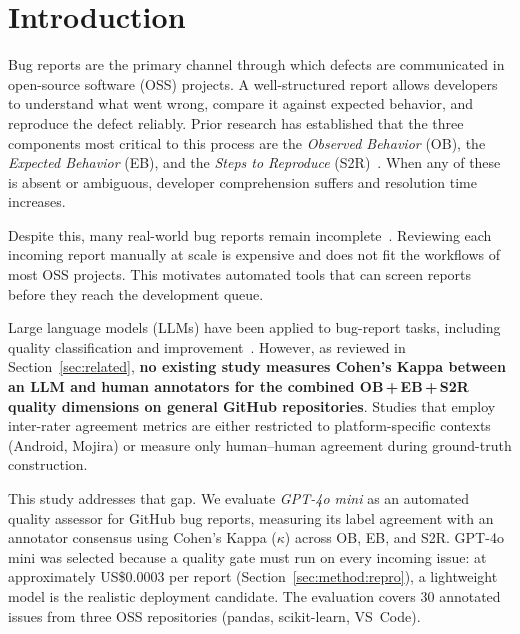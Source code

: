 
\section{Introduction}\label{sec:intro}

Bug reports are the primary channel through which defects are
communicated in open-source software (OSS) projects.  A well-structured
report allows developers to understand what went wrong, compare it
against expected behavior, and reproduce the defect reliably.  Prior
research has established that the three components most critical to
this process are the \emph{Observed Behavior} (OB), the \emph{Expected
Behavior} (EB), and the \emph{Steps to Reproduce}
(S2R)~\cite{song2020bee, mahmud2025astrobr, akyol2026improbr}.  When
any of these is absent or ambiguous, developer comprehension suffers
and resolution time increases.

Despite this, many real-world bug reports remain
incomplete~\cite{fan2020chaff}.  Reviewing each incoming report
manually at scale is expensive and does not fit the workflows of most
OSS projects.  This motivates automated tools that can screen reports
before they reach the development queue.

Large language models (LLMs) have been applied to bug-report tasks,
including quality classification and improvement~\cite{bo2024chatbr,
acharya2025enhance}.  However, as reviewed in
Section~\ref{sec:related}, \textbf{no existing study measures Cohen's
Kappa between an LLM and human annotators for the combined
OB\,+\,EB\,+\,S2R quality dimensions on general GitHub repositories}.
Studies that employ inter-rater agreement metrics are either restricted
to platform-specific contexts (Android, Mojira) or measure only
human--human agreement during ground-truth construction.

This study addresses that gap.  We evaluate \emph{GPT-4o mini} as an
automated quality assessor for GitHub bug reports, measuring its label
agreement with an annotator consensus using Cohen's Kappa ($\kappa$)
across OB, EB, and S2R.  GPT-4o mini was selected because a quality
gate must run on every incoming issue: at approximately
US\$0.0003 per report (Section~\ref{sec:method:repro}), a lightweight
model is the realistic deployment candidate.  The evaluation covers 30
annotated issues from three OSS repositories (pandas, scikit-learn,
VS~Code).

